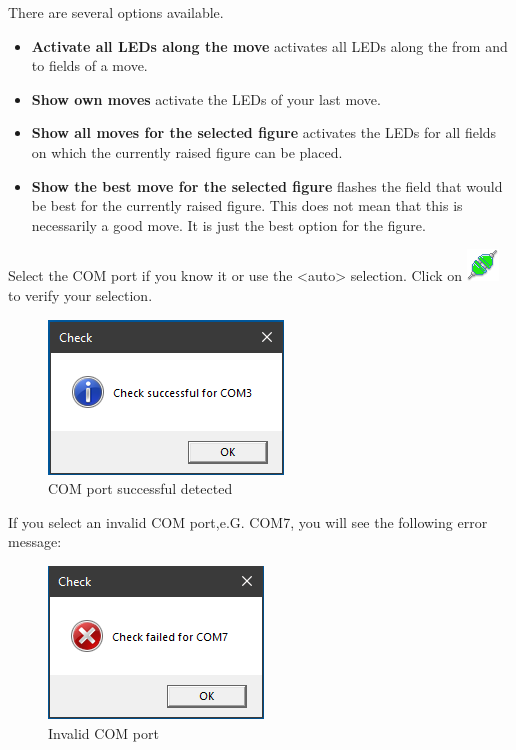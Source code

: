 \documentclass[11pt,a4paper]{article}
\begin{document}
There are several options available.
\begin{itemize}
	\item \textbf{Activate all LEDs along the move} activates all LEDs along the from and to fields of a move.
	\item \textbf{Show own moves} activate the LEDs of your last move.
	\item \textbf{Show all moves for the selected figure} activates the LEDs for all fields on which the currently raised figure can be placed.
	\item \textbf{Show the best move for the selected figure} flashes the field that would be best for the currently raised figure. This does not mean that this is necessarily a good move. It is just the best option for the figure.
\end{itemize}

Select the COM port if you know it or use the <auto> selection.
Click on \includegraphics[scale=0.5]{connect.png} to verify your selection.

\begin{figure}[H]
	\centering
	\includegraphics[scale=1.0]{MillenniumChessLink3.png}
	\caption{COM port successful detected }
	\label{fig:MillenniumChessLink3}
\end{figure}

If you select an invalid COM port,e.G. COM7, you will see the following error message:

\begin{figure}[H]
	\centering
	\includegraphics[scale=1.0]{MillenniumChessLink4.png}
	\caption{Invalid COM port }
	\label{fig:MillenniumChessLink4}
\end{figure}
\end{document}
